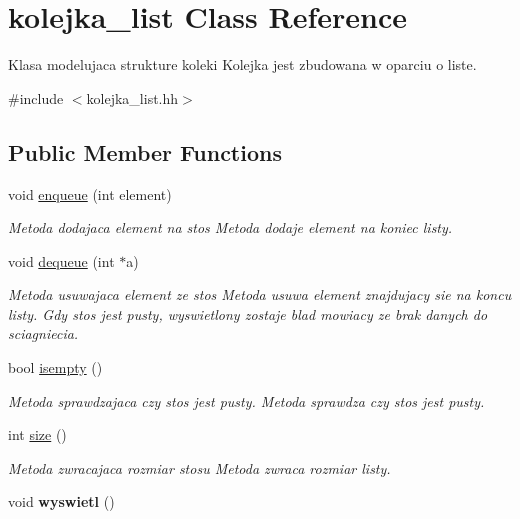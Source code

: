 \hypertarget{classkolejka__list}{\section{kolejka\-\_\-list Class Reference}
\label{classkolejka__list}
}


Klasa modelujaca strukture koleki Kolejka jest zbudowana w oparciu o liste.  




{\ttfamily \#include $<$kolejka\-\_\-list.\-hh$>$}

\subsection*{Public Member Functions}
\begin{DoxyCompactItemize}
\item 
void \hyperlink{classkolejka__list_a2a76455362c9cf450d2075aeae499459}{enqueue} (int element)
\begin{DoxyCompactList}\small\item\em Metoda dodajaca element na stos Metoda dodaje element na koniec listy. \end{DoxyCompactList}\item 
void \hyperlink{classkolejka__list_a3a84760a00752eaa7602b88340687d5e}{dequeue} (int $\ast$a)
\begin{DoxyCompactList}\small\item\em Metoda usuwajaca element ze stos Metoda usuwa element znajdujacy sie na koncu listy. Gdy stos jest pusty, wyswietlony zostaje blad mowiacy ze brak danych do sciagniecia. \end{DoxyCompactList}\item 
bool \hyperlink{classkolejka__list_a11bb29b9cac656ae67123ba5e107c9ba}{isempty} ()
\begin{DoxyCompactList}\small\item\em Metoda sprawdzajaca czy stos jest pusty. Metoda sprawdza czy stos jest pusty. \end{DoxyCompactList}\item 
int \hyperlink{classkolejka__list_a0571b6ad15a8f22baf979e190e78b369}{size} ()
\begin{DoxyCompactList}\small\item\em Metoda zwracajaca rozmiar stosu Metoda zwraca rozmiar listy. \end{DoxyCompactList}\item 
\hypertarget{classkolejka__list_a62a511ff87070478dbc727f52ea5533f}{void {\bfseries wyswietl} ()}\label{classkolejka__list_a62a511ff87070478dbc727f52ea5533f}

\end{DoxyCompactItemize}


